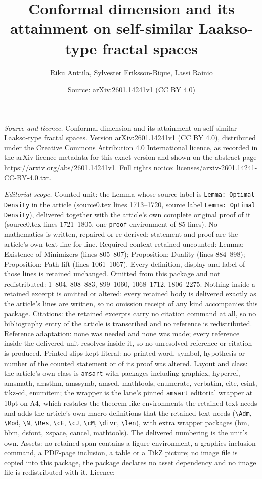 \documentclass[10pt,a4paper]{amsart}
\title[Conformal dimension and its attainment on self-similar Laaks]{Conformal dimension and its attainment on self-similar Laakso-type fractal spaces}
\author{Riku Anttila, Sylvester Eriksson-Bique, Lassi Rainio}
\date{Source: arXiv:2601.14241v1 (CC BY 4.0)}
\begin{document}
\maketitle

\noindent\emph{Source and licence.} Conformal dimension and its attainment on self-similar Laakso-type fractal spaces. Version arXiv:2601.14241v1 (CC BY 4.0), distributed under the Creative Commons Attribution 4.0 International licence, as recorded in the arXiv licence metadata for this exact version and shown on the abstract page https://arxiv.org/abs/2601.14241v1. Full rights notice: licenses/arxiv-2601.14241-CC-BY-4.0.txt.\par\smallskip

\noindent\textit{Editorial scope.} Counted unit: the Lemma whose source label is \texttt{Lemma: Optimal Density} in the article (source0.tex lines 1713--1720, source label \texttt{Lemma: Optimal Density}), delivered together with the article's own complete original proof of it (source0.tex lines 1721--1805, one \texttt{proof} environment of 85 lines). No mathematics is written, repaired or re-derived: statement and proof are the article's own text line for line. Required context retained uncounted: Lemma: Existence of Minimizers (lines 805--807); Proposition: Duality (lines 884--898); Proposition: Path lift (lines 1061--1067). Every definition, display and label of those lines is retained unchanged. Omitted from this package and not redistributed: 1--804, 808--883, 899--1060, 1068--1712, 1806--2275. Nothing inside a retained excerpt is omitted or altered: every retained body is delivered exactly as the article's lines are written, so no omission receipt of any kind accompanies this package. Citations: the retained excerpts carry no citation command at all, so no bibliography entry of the article is transcribed and no reference is redistributed. Reference adaptation: none was needed and none was made; every reference inside the delivered unit resolves inside it, so no unresolved reference or citation is produced. Printed slips kept literal: no printed word, symbol, hypothesis or number of the counted statement or of its proof was altered. Layout and class: the article's own class is \texttt{amsart} with packages including graphicx, hyperref, amsmath, amsthm, amssymb, amscd, mathtools, enumerate, verbatim, cite, esint, tikz-cd, enumitem; the wrapper is the lane's pinned \texttt{amsart} editorial wrapper at 10pt on A4, which restates the theorem-like environments the retained text needs and adds the article's own macro definitions that the retained text needs (\texttt{\textbackslash Adm}, \texttt{\textbackslash Mod}, \texttt{\textbackslash N}, \texttt{\textbackslash Res}, \texttt{\textbackslash cE}, \texttt{\textbackslash cJ}, \texttt{\textbackslash cM}, \texttt{\textbackslash divr}, \texttt{\textbackslash len}), with extra wrapper packages (bm, bbm, dsfont, xspace, cancel, mathtools). The delivered numbering is the unit's own. Assets: no retained span contains a figure environment, a graphics-inclusion command, a PDF-page inclusion, a table or a TikZ picture; no image file is copied into this package, the package declares no asset dependency and no image file is redistributed with it. Licence: 
\end{document}

